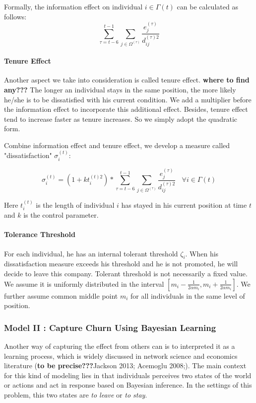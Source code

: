 \documentclass[tcn = 37075, sheet = true, abstract = true]{mcmthesis}
\begin{document}
Formally, the information effect on individual $i\in \Gamma{(t)}$ can be calculated as follows:
$$\displaystyle \sum_{\tau=t-6}^{t-1}\sum_{j\in \Omega^{(\tau)}}\frac{e_j^{(\tau)}}{d_{ij}^{(\tau)2}}$$

\paragraph{Tenure Effect}
Another aspect we take into consideration is called tenure effect. \textbf{where to find any???} The longer an individual stays in the same position, the more likely he/she is to be dissatisfied with his current condition. We add a multiplier before the information effect to incorporate this additional effect. Besides, tenure effect tend to increase faster as tenure increases. So we simply adopt the quadratic form.

Combine information effect and tenure effect, we develop a measure called "dissatisfaction" $\sigma_i^{(t)}$:

$$\displaystyle \sigma_i^{(t)}=(1+kt_i^{(t)2})*\sum_{\tau=t-6}^{t-1}\sum_{j\in \Omega^{(\tau)}}\frac{e_j^{(\tau)}}{d_{ij}^{(\tau)2}}~~~~\forall i\in \Gamma{(t)}
$$

Here $t_i^{(t)}$ is the length of individual $i$ has stayed in his current position at time $t$ and $k$ is the control parameter. 

\paragraph{Tolerance Threshold}
For each individual, he has an internal tolerant threshold $\zeta_i$. When his dissatisfaction measure exceeds his threshold and he is not promoted, he will decide to leave this company. Tolerant threshold is not necessarily a fixed value. We assume it is uniformly distributed in the interval $[m_i-\frac{1}{2\alpha m_i},m_i+\frac{1}{2\alpha m_i}]$. We further assume common middle point $m_i$ for all individuals in the same level of position.



\subsubsection{Model II : Capture Churn Using Bayesian Learning}

Another way of capturing the effect from others can is to interpreted it as a learning process, which is widely discussed in network science and economics literature (\textbf{to be precise???}Jackson 2013; Acemoglu 2008;). The main context for this kind of modeling lies in that individuals perceives two states of the world or actions and act in response based on Bayesian inference. In the settings of this problem, this two states are \textit{to leave} or \textit{to stay}.
\end{document}
